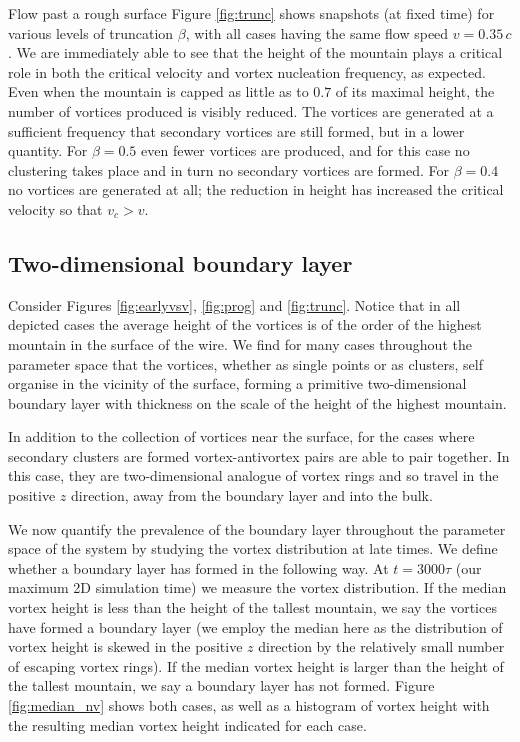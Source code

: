 \begin{chapter}{\label{cha:afm}Flow past a rough surface}
Figure \ref{fig:trunc} shows snapshots (at fixed time) for various levels of truncation $\beta$, with all cases having the same flow speed $v=0.35\,c$.  We are immediately able to see that the height of the mountain plays a critical role in both the critical velocity and vortex nucleation frequency, as expected.  Even when the mountain is capped as little as to $0.7$ of its maximal height, the number of vortices produced is visibly reduced.  The vortices are generated at a sufficient frequency that secondary vortices are still formed, but in a lower quantity.  For $\beta=0.5$ even fewer vortices are produced, and for this case no clustering takes place and in turn no secondary vortices are formed.  For $\beta=0.4$ no vortices are generated at all; the reduction in height has increased the critical velocity so that $v_c>v$.
 
\subsection{Two-dimensional boundary layer}
Consider Figures \ref{fig:earlyvsv}, \ref{fig:prog} and \ref{fig:trunc}. Notice that in all depicted cases the average height of the vortices is of the order of the highest mountain in the surface of the wire. We find for many cases throughout the parameter space that the vortices, whether as single points or as clusters, self organise in the vicinity of the surface, forming a primitive two-dimensional boundary layer with thickness on the scale of the height of the highest mountain.

In addition to the collection of vortices near the surface, for the cases where secondary clusters are formed vortex-antivortex pairs are able to pair together. In this case, they are two-dimensional analogue of vortex rings and so travel in the positive $z$ direction, away from the boundary layer and into the bulk.

We now quantify the prevalence of the boundary layer throughout the parameter space of the system by studying the vortex distribution at late times. We define whether a boundary layer has formed in the following way. At $t=3000\tau$ (our maximum 2D simulation time) we measure the vortex distribution. If the median vortex height is less than the height of the tallest mountain, we say the vortices have formed a boundary layer (we employ the median here as the distribution of vortex height is skewed in the positive $z$ direction by the relatively small number of escaping vortex rings). If the median vortex height is larger than the height of the tallest mountain, we say a boundary layer has not formed. Figure \ref{fig:median_nv} shows both cases, as well as a histogram of vortex height with the resulting median vortex height indicated for each case.


\end{chapter}
